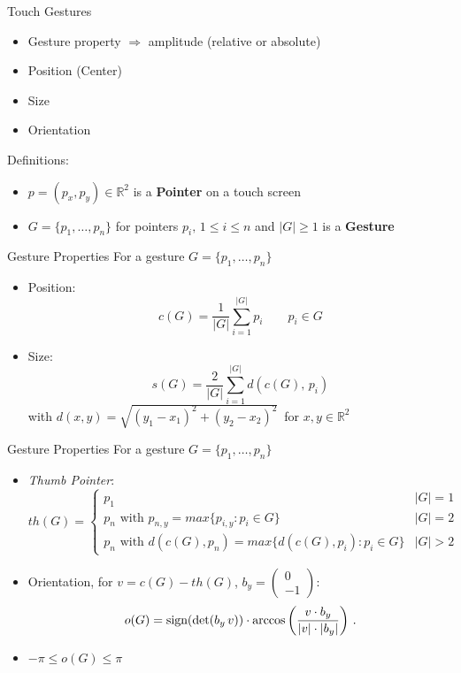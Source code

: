 \documentclass[t]{beamer}
\newcommand{\vectwo}[2]{
	\left(
	\begin{matrix}
		#1 \\
		#2 
	\end{matrix}
	\right)
}
\begin{document}
\begin{frame}{Touch Gestures}
\begin{itemize}
	\item Gesture property $\Rightarrow$ amplitude (relative or absolute)
	\item Position (Center)
	\item Size
	\item Orientation
\end{itemize}
Definitions:
\begin{itemize}
	\item $p = (p_x, p_y) \in \mathbb{R}^2$ is a \textbf{Pointer} on a touch screen
	\item $G = \{p_1,\dots , p_n\}$ for pointers $p_i,\,1 \leq i \leq n$ and $|G| \geq 1$ is a \textbf{Gesture}
\end{itemize}
\end{frame}

\begin{frame}{Gesture Properties}
For a gesture $G = \{p_1,\dots,p_n\}$
\begin{itemize}
	\item Position: \begin{equation}
	c(G) = \frac{1}{|G|}\sum_{i=1}^{|G|}p_i \qquad  p_i \in G
	\end{equation}
	
	\item Size: \begin{equation}
	s(G) = \frac{2}{|G|}\sum_{i=1}^{|G|} d(c(G), \, p_i)
	\end{equation}
	with $d(x, y) = \sqrt{(y_1 - x_1)^2 + (y_2 - x_2)^2}\,$ for $x, y \in \mathbb{R}^2$
\end{itemize}
\end{frame}

\begin{frame}{Gesture Properties}
For a gesture $G = \{p_1,\dots,p_n\}$

\begin{itemize}
	\item \textit{Thumb Pointer}:
	{\footnotesize
	\begin{equation}
	th(G) = \left\{
	\begin{array}{ll}
	p_1 & |G| = 1 \\
	p_n \text{ with } p_{n,y} = max\{p_{i,y} : p_i \in G\} & |G| = 2 \\
	p_n \text{ with } d(c(G), p_n) = max\{ d(c(G), p_i) : p_i \in G \}& |G| > 2
	\end{array}
	\right.
	\end{equation}}

	\item Orientation, for $v = c(G) - th(G)$,  $b_y = \vectwo{0}{-1}$:
	\begin{equation}
	\label{eq:conc:orientation}
	o(G) = \textnormal{sign}(\det(b_y\, v)) \cdot \arccos\left(\frac{v \cdot b_y}{|v| \cdot |b_y|}\right) \, .
	\end{equation}	

	\item $-\pi \leq o(G) \leq \pi $
\end{itemize}

\end{frame}
\end{document}
